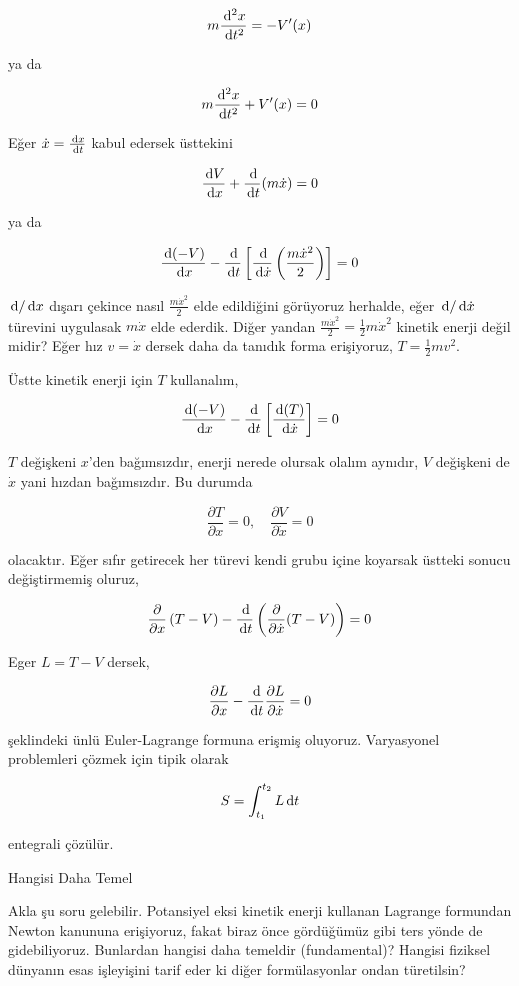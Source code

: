 \documentclass[12pt,fleqn]{article}\usepackage{../../common}
\begin{document}
$$
m \frac{\,\mathrm{d}^2 x}{\,\mathrm{d} t^2} = -V'(x)
$$

ya da

$$
m \frac{\,\mathrm{d}^2 x}{\,\mathrm{d} t^2} + V'(x) = 0
$$

Eğer $\dot{x} = \frac{\,\mathrm{d} x}{\,\mathrm{d} t}$ kabul edersek üsttekini

$$
\frac{\,\mathrm{d} V}{\,\mathrm{d} x} + \frac{\,\mathrm{d}}{\,\mathrm{d} t} (m\dot{x}) = 0
$$

ya da

$$
\frac{\,\mathrm{d} (-V)}{\,\mathrm{d} x} -
\frac{\,\mathrm{d}}{\,\mathrm{d} t}
  \left[
     \frac{\,\mathrm{d} }{\,\mathrm{d} \dot{x}} \left( \frac{m\dot{x}^2}{2} \right)
  \right] =0 
$$

$\,\mathrm{d} / \,\mathrm{d} x$ dışarı çekince nasıl $\frac{m\dot{x}^2}{2}$ elde edildiğini
görüyoruz herhalde, eğer $\,\mathrm{d} / \,\mathrm{d} \dot{x}$ türevini uygulasak $m\dot{x}$
elde ederdik. Diğer yandan $\frac{m\dot{x}^2}{2} = \frac{1}{2} m\dot{x}^2 $
kinetik enerji değil midir? Eğer hız $v = \dot{x}$ dersek daha da tanıdık
forma erişiyoruz, $T = \frac{1}{2} mv^2$.

Üstte kinetik enerji için $T$ kullanalım,
  
$$
\frac{\,\mathrm{d} (-V)}{\,\mathrm{d} x} -
\frac{\,\mathrm{d}}{\,\mathrm{d} t}
  \left[ \frac{\,\mathrm{d} (T)}{\,\mathrm{d} \dot{x}} \right] =0 
$$


$T$ değişkeni $x$'den bağımsızdır, enerji nerede olursak olalım aynıdır, $V$
değişkeni de $\dot{x}$ yani hızdan bağımsızdır. Bu durumda

$$
\frac{\partial T}{\partial x} = 0, \quad
\frac{\partial V}{\partial \dot{x}} = 0
$$

olacaktır. Eğer sıfır getirecek her türevi kendi grubu içine koyarsak üstteki
sonucu değiştirmemiş oluruz,

$$
\frac{\partial }{\partial x} \left( T - V  \right) -
\frac{\,\mathrm{d}}{\,\mathrm{d} t} \left( \frac{\partial }{\partial \dot{x}} (T - V)  \right) = 0
$$

Eger $L = T - V$ dersek,

$$
\frac{\partial L}{\partial x} - \frac{\,\mathrm{d}}{\,\mathrm{d} t} \frac{\partial L}{\partial \dot{x}} = 0
$$

şeklindeki ünlü Euler-Lagrange formuna erişmiş oluyoruz. Varyasyonel problemleri
çözmek için tipik olarak

$$
S = \int_{t_1}^{t_2} L \,\mathrm{d} t
$$

entegrali çözülür.

Hangisi Daha Temel

Akla şu soru gelebilir. Potansiyel eksi kinetik enerji kullanan Lagrange
formundan Newton kanununa erişiyoruz, fakat biraz önce gördüğümüz gibi ters
yönde de gidebiliyoruz. Bunlardan hangisi daha temeldir (fundamental)? Hangisi
fiziksel dünyanın esas işleyişini tarif eder ki diğer formülasyonlar ondan
türetilsin?
\end{document}
